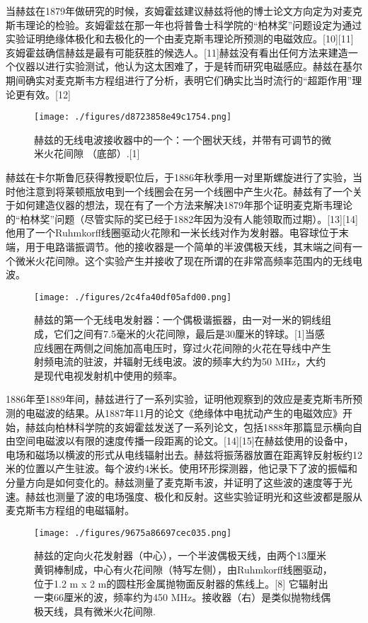 当赫兹在1879年做研究的时候，亥姆霍兹建议赫兹将他的博士论文方向定为对麦克斯韦理论的检验。亥姆霍兹在那一年也将普鲁士科学院的“柏林奖”问题设定为通过实验证明绝缘体极化和去极化的一个由麦克斯韦理论所预测的电磁效应。[10][11]亥姆霍兹确信赫兹是最有可能获胜的候选人。[11]赫兹没有看出任何方法来建造一个仪器以进行实验测试，他认为这太困难了，于是转而研究电磁感应。赫兹在基尔期间确实对麦克斯韦方程组进行了分析，表明它们确实比当时流行的“超距作用”理论更有效。[12]
\begin{figure}[ht]
\centering
\texttt{[image: ./figures/d8723858e49c1754.png]}
\caption{赫兹的无线电波接收器中的一个：一个圈状天线，并带有可调节的微米火花间隙 （底部）.[1]} \label{fig_Hertz_2}
\end{figure}
赫兹在卡尔斯鲁厄获得教授职位后，于1886年秋季用一对里斯螺旋进行了实验，当时他注意到将莱顿瓶放电到一个线圈会在另一个线圈中产生火花。赫兹有了一个关于如何建造仪器的想法，现在有了一个方法来解决1879年那个证明麦克斯韦理论的“柏林奖”问题（尽管实际的奖已经于1882年因为没有人能领取而过期）。[13][14]他用了一个Ruhmkorff线圈驱动火花隙和一米长线对作为发射器。电容球位于末端，用于电路谐振调节。他的接收器是一个简单的半波偶极天线，其末端之间有一个微米火花间隙。这个实验产生并接收了现在所谓的在非常高频率范围内的无线电波。
\begin{figure}[ht]
\centering
\texttt{[image: ./figures/2c4fa40df05afd00.png]}
\caption{赫兹的第一个无线电发射器：一个偶极谐振器，由一对一米的铜线组成，它们之间有7.5毫米的火花间隙，最后是30厘米的锌球。[1]当感应线圈在两侧之间施加高电压时，穿过火花间隙的火花在导线中产生射频电流的驻波，并辐射无线电波。波的频率大约为50 MHz，大约是现代电视发射机中使用的频率。} \label{fig_Hertz_3}
\end{figure}
1886年至1889年间，赫兹进行了一系列实验，证明他观察到的效应是麦克斯韦所预测的电磁波的结果。从1887年11月的论文《绝缘体中电扰动产生的电磁效应》开始，赫兹向柏林科学院的亥姆霍兹发送了一系列论文，包括1888年那篇显示横向自由空间电磁波以有限的速度传播一段距离的论文。[14][15]在赫兹使用的设备中，电场和磁场以横波的形式从电线辐射出去。赫兹将振荡器放置在距离锌反射板约12米的位置以产生驻波。每个波约4米长。使用环形探测器，他记录下了波的振幅和分量方向是如何变化的。赫兹测量了麦克斯韦波，并证明了这些波的速度等于光速。赫兹也测量了波的电场强度、极化和反射。这些实验证明光和这些波都是服从麦克斯韦方程组的电磁辐射。
\begin{figure}[ht]
\centering
\texttt{[image: ./figures/9675a86697cec035.png]}
\caption{赫兹的定向火花发射器（中心），一个半波偶极天线，由两个13厘米黄铜棒制成，中心有火花间隙（特写左侧），由Ruhmkorff线圈驱动，位于1.2 m x 2 m的圆柱形金属抛物面反射器的焦线上。[8] 它辐射出一束66厘米的波，频率约为450 MHz。接收器（右）是类似抛物线偶极天线，具有微米火花间隙.} \label{fig_Hertz_4}
\end{figure}
